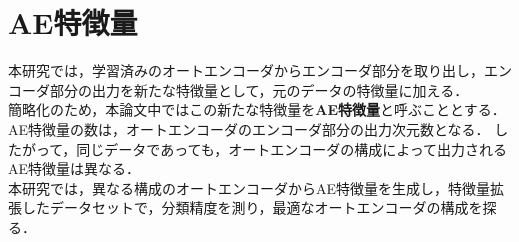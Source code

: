 \section{AE特徴量}
本研究では，学習済みのオートエンコーダからエンコーダ部分を取り出し，エンコーダ部分の出力を新たな特徴量として，元のデータの特徴量に加える．\\
簡略化のため，本論文中ではこの新たな特徴量を\textbf{AE特徴量}と呼ぶこととする．\\
AE特徴量の数は，オートエンコーダのエンコーダ部分の出力次元数となる．
したがって，同じデータであっても，オートエンコーダの構成によって出力されるAE特徴量は異なる．\\
本研究では，異なる構成のオートエンコーダからAE特徴量を生成し，特徴量拡張したデータセットで，分類精度を測り，最適なオートエンコーダの構成を探る．\\